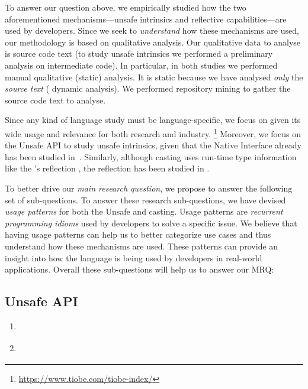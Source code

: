 To answer our question above,
we empirically studied how the two aforementioned mechanisms---unsafe intrinsics and reflective capabilities---are used by developers.
Since we seek to \emph{understand} how these mechanisms are used,
our methodology is based on qualitative analysis.
Our qualitative data to analyse is source code text
(to study unsafe intrinsics we performed a preliminary analysis on intermediate code).
In particular, in both studies we performed manual qualitative (static) analysis.
It is static because we have analysed \emph{only} the \emph{source text}
(\cf{} dynamic analysis).
We performed repository mining to gather the source code text to analyse.

Since any kind of language study must be language-specific,
we focus on \java{} given its wide usage and relevance for both
research and industry.%
\footnote{\url{https://www.tiobe.com/tiobe-index/}}
Moreover, we focus on the \java{} Unsafe API to study unsafe intrinsics,
given that the \java{} Native Interface already has been studied
in~\cite{tanSafeJavaNative2006,tanEmpiricalSecurityStudy2008,kondohFindingBugsJava2008,sunNativeGuardProtectingAndroid2014,liFindingBugsExceptional2009}.
Similarly, although casting uses run-time type information like
the \java{}'s reflection \api{},
the reflection \api{} has been studied in
\cite{livshitsImprovingSoftwareSecurity2006,livshitsReflectionAnalysisJava2005,landmanChallengesStaticAnalysis2017}.

To better drive our \emph{main research question},
we propose to answer the following set of sub-questions.
To answer these research sub-questions,
we have devised \emph{usage patterns} for both the Unsafe \api{} and casting.
Usage patterns are \emph{recurrent programming idioms} used by developers to solve a specific issue.
We believe that having usage patterns can help us to better categorize use cases and
thus understand how these mechanisms are used.
These patterns can provide an insight into how the language is being used by developers in real-world applications.
Overall these sub-questions will help us to answer our MRQ:

\subsection*{Unsafe API}

\begin{enumerate}[label=$RQ/U\arabic*:$,leftmargin=3.4\parindent]
\item {\bf \urqA} \urqAdesc{}
\item {\bf \urqB} \urqBdesc{}
\end{enumerate}

